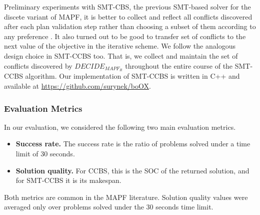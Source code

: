 \documentclass[review]{elsarticle}
\newcommand{\decidemapfr}{\ensuremath{\mathit{DECIDE_{MAPF_R}}}\xspace}
\newcommand\roni[1]{\nb{\textbf{Roni:}}{green}{#1}}
\newcommand\pavel[1]{\nb{\textbf{Pavel:}}{blue}{#1}}
\newcommand{\ccbs}{\ac{CCBS}\xspace}
\newcommand{\mapfr}{\ac{MAPF}$_R$\xspace}
\newcommand{\smtcbsO}{SMT-CBS\xspace} %
\newcommand{\smtccbs}{SMT-CCBS\xspace}
\newcommand{\mapf}{\ac{MAPF}\xspace}
\begin{document}

Preliminary experiments with \smtcbsO, the previous SMT-based solver for the discete variant of \mapf, it is better to collect and reflect all conflicts discovered after each plan validation step rather than choosing a subset of them according to any preference \cite{surynek2019lazy}. It also turned out to be good to transfer set of conflicts to the next value of the objective in the iterative scheme. We follow the analogous design choice in \smtccbs too. That is, we collect and maintain the set of conflicts discovered by \decidemapfr throughout the entire course of the \smtccbs algorithm. Our implementation of \smtccbs is written in C++ and available at \url{https://github.com/surynek/boOX}.


\subsubsection{Evaluation Metrics}
In our evaluation, we considered the following two main evaluation metrics. 
\begin{itemize}
    \item \textbf{Success rate.} The success rate is the ratio of problems solved under a time limit of 30 seconds. 
    \item \textbf{Solution quality.} For \ccbs, this is the SOC of the returned solution, and for \smtccbs it is its makespan.
\end{itemize}

Both metrics are common in the \mapf literature. Solution quality values were averaged only over problems solved under the 30 seconds time limit. 
\end{document}

